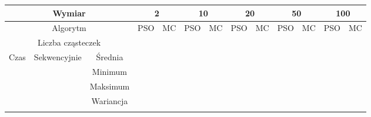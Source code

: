 \documentclass[11pt, a4paper, oneside]{article}
\begin{document}
\begin{table}[h]
\begin{adjustwidth}{-1cm}{}
\centering
\begin{tabular}{|c|c|c|l|l|l|l|l|l|l|l|l|l|}
\hline
\multicolumn{3}{|c|}{Wymiar}                                      & \multicolumn{2}{c|}{2}                             & \multicolumn{2}{c|}{10}                            & \multicolumn{2}{c|}{20}                            & \multicolumn{2}{c|}{50}                            & \multicolumn{2}{c|}{100}                            \\ \hline
\multicolumn{3}{|c|}{Algorytm}                                    & \multicolumn{1}{c|}{PSO} & \multicolumn{1}{c|}{MC} & \multicolumn{1}{c|}{PSO} & \multicolumn{1}{c|}{MC} & \multicolumn{1}{c|}{PSO} & \multicolumn{1}{c|}{MC} & \multicolumn{1}{c|}{PSO} & \multicolumn{1}{c|}{MC} & \multicolumn{1}{c|}{PSO} & \multicolumn{1}{c|}{MC} \\ \hline
\multicolumn{3}{|c|}{Liczba cząsteczek}                           &                          &                         &                          &                         &                          &                         &                          &                         &                          &                         \\ \hline
\multirow{8}{*}{Czas} & \multirow{4}{*}{Sekwencyjnie} & Średnia   &                          &                         &                          &                         &                          &                         &                          &                         &                          &                         \\ \cline{3-13} 
                      &                               & Minimum   &                          &                         &                          &                         &                          &                         &                          &                         &                          &                         \\ \cline{3-13} 
                      &                               & Maksimum  &                          &                         &                          &                         &                          &                         &                          &                         &                          &                         \\ \cline{3-13} 
                      &                               & Wariancja &                          &                         &                          &                         &                          &                         &                          &                         &                          &                         \\ \cline{2-13} 

\end{tabular}
\end{adjustwidth}
\end{table}
\end{document}

